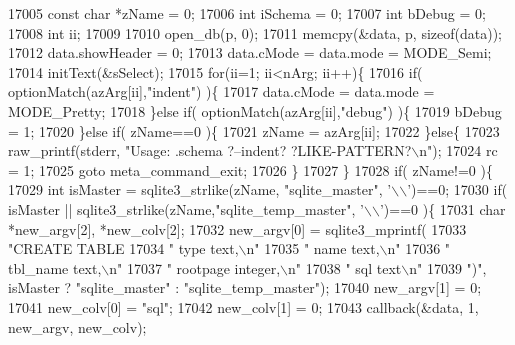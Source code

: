 \begin{DoxyCode}
{{{{{{{{{{{{{{{{{{{{{{{{{{{{{{{{{{{{{{{{{{{{{{{{{{{{{{{{{{{{{{{{{{{{{{{{{{{{17005     \textcolor{keyword}{const} \textcolor{keywordtype}{char} *zName = 0;
17006     \textcolor{keywordtype}{int} iSchema = 0;
17007     \textcolor{keywordtype}{int} bDebug = 0;
17008     \textcolor{keywordtype}{int} ii;
17009 
17010     open_db(p, 0);
17011     memcpy(&data, p, \textcolor{keyword}{sizeof}(data));
17012     data.showHeader = 0;
17013     data.cMode = data.mode = MODE_Semi;
17014     initText(&sSelect);
17015     \textcolor{keywordflow}{for}(ii=1; ii<nArg; ii++)\{
17016       \textcolor{keywordflow}{if}( optionMatch(azArg[ii],\textcolor{stringliteral}{"indent"}) )\{
17017         data.cMode = data.mode = MODE_Pretty;
17018       \}\textcolor{keywordflow}{else} \textcolor{keywordflow}{if}( optionMatch(azArg[ii],\textcolor{stringliteral}{"debug"}) )\{
17019         bDebug = 1;
17020       \}\textcolor{keywordflow}{else} \textcolor{keywordflow}{if}( zName==0 )\{
17021         zName = azArg[ii];
17022       \}\textcolor{keywordflow}{else}\{
17023         raw_printf(stderr, \textcolor{stringliteral}{"Usage: .schema ?--indent? ?LIKE-PATTERN?\(\backslash\)n"});
17024         rc = 1;
17025         \textcolor{keywordflow}{goto} meta\_command\_exit;
17026       \}
17027     \}
17028     \textcolor{keywordflow}{if}( zName!=0 )\{
17029       \textcolor{keywordtype}{int} isMaster = sqlite3_strlike(zName, \textcolor{stringliteral}{"sqlite\_master"}, \textcolor{charliteral}{'\(\backslash\)\(\backslash\)'})==0;
17030       \textcolor{keywordflow}{if}( isMaster || sqlite3_strlike(zName,\textcolor{stringliteral}{"sqlite\_temp\_master"}, \textcolor{charliteral}{'\(\backslash\)\(\backslash\)'})==0 )\{
17031         \textcolor{keywordtype}{char} *new\_argv[2], *new\_colv[2];
17032         new\_argv[0] = sqlite3_mprintf(
17033                       \textcolor{stringliteral}{"CREATE TABLE %
17034                       \textcolor{stringliteral}{"  type text,\(\backslash\)n"}
17035                       \textcolor{stringliteral}{"  name text,\(\backslash\)n"}
17036                       \textcolor{stringliteral}{"  tbl\_name text,\(\backslash\)n"}
17037                       \textcolor{stringliteral}{"  rootpage integer,\(\backslash\)n"}
17038                       \textcolor{stringliteral}{"  sql text\(\backslash\)n"}
17039                       \textcolor{stringliteral}{")"}, isMaster ? \textcolor{stringliteral}{"sqlite\_master"} : \textcolor{stringliteral}{"sqlite\_temp\_master"});
17040         new\_argv[1] = 0;
17041         new\_colv[0] = \textcolor{stringliteral}{"sql"};
17042         new\_colv[1] = 0;
17043         callback(&data, 1, new\_argv, new\_colv);
}}}}}}}}}}}}}}}}}}}}}}}}}}}}}}}}}}}}}}}}}}}}}}}}}}}}}}}}}}}}}}}}}}}}}}}}}}}}}
\end{DoxyCode}
